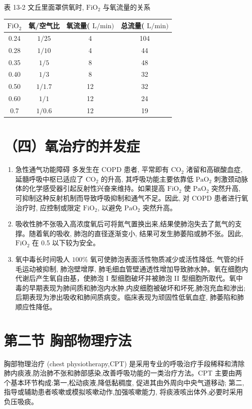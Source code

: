 \documentclass[10pt]{article}
\begin{document}
表 13-2 文丘里面罩供氧时, $\mathrm{FiO}_{2}$ 与氧流量的关系

\begin{center}
\begin{tabular}{cccc}
\hline
$\mathrm{FiO}_{2}$ & 氧/空气比 & 氧流量( $\mathrm{L} / \mathrm{min})$ & 总流量( $\mathrm{L} / \mathrm{min})$ \\
\hline
0.24 & $1 / 25$ & 4 & 104 \\
0.28 & $1 / 10$ & 4 & 44 \\
0.35 & $1 / 5$ & 8 & 48 \\
0.40 & $1 / 3$ & 8 & 32 \\
0.50 & $1 / 1.7$ & 12 & 32 \\
0.60 & $1 / 1$ & 12 & 24 \\
0.7 & $1 / 0.6$ & 12 & 19 \\
\hline
\end{tabular}
\end{center}

\section*{（四）氧治疗的并发症}
\begin{enumerate}
  \item 急性通气功能障碍 多发生在 COPD 患者, 平常即有 $\mathrm{CO}_{2}$ 渚留和高碳酸血症, 延髓呼吸中枢已适应了 $\mathrm{CO}_{2}$ 的升高, 其呼吸功能主要依靠低 $\mathrm{PaO}_{2}$ 刺激颈动脉体的化学感受器引起反射性兴奋来维持。如果提高 $\mathrm{FiO}_{2}$ 使 $\mathrm{PaO}_{2}$ 突然升高, 可抑制这种反射机制而导致呼吸抑制和通气不足。因此, 对 COPD 患者进行氧治疗时, 应控制或限定 $\mathrm{FiO}_{2}$, 以避免 $\mathrm{PaO}_{2}$ 突然升高。

  \item 吸收性肺不张吸入高浓度氧后可将氮气置换出来,结果使肺泡失去了氮气的支撑。随着氧的吸收, 肺泡的直径逐渐变小, 结果可发生肺萎陷或肺不张。因此, $\mathrm{FiO}_{2}$ 在 0.5 以下较为安全。

  \item 氧中毒长时间吸人 $100 \%$ 氧可使肺泡表面活性物质减少或活性降低, 气管的纤毛运动被抑制, 肺泡壁增厚, 肺毛细血管壁通透性增加导致肺水肿。氧在细胞内代谢后产生氧自由基，使肺泡 I 型细胞破坏并被肺泡 II 型细胞所取代。氧中毒的早期表现为肺间质和肺泡内水肿,内皮细胞被破坏和坏死,肺泡充血和渗出; 后期表现为渗出吸收和肺间质病变。临床表现为顽固性低氧血症, 肺萎陷和肺顺应性降低。

\end{enumerate}

\section*{第二节 胸部物理疗法}
胸部物理治疗 (chest physiotherapy,CPT) 是采用专业的呼吸治疗手段稀释和清除肺内痰液,防治肺不张和肺部感染,改善呼吸功能的一类治疗方法。CPT 主要由两个基本环节构成:第一,松动痰液,降低黏稠度, 促进其由外周向中央气道移动; 第二, 指导或辅助患者咳嗽或模拟咳嗽动作,加强咳嗽能力, 将痰液咳出体外,必要时采用负压吸痰。
\end{document}
